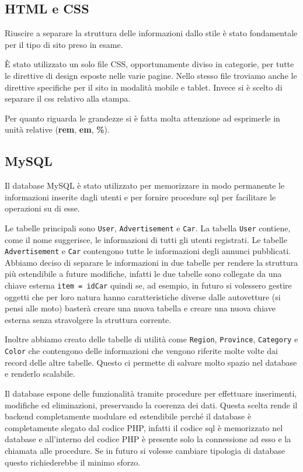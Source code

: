 	\subsection{HTML e CSS}
	\par Riuscire a separare la struttura delle informazioni dallo stile è stato fondamentale per il tipo di sito preso in esame.
	\par \`E stato utilizzato un solo file CSS, opportunamente diviso in categorie, per tutte le direttive di design esposte nelle varie pagine. Nello stesso file troviamo anche le direttive specifiche per il sito in modalità mobile e tablet. Invece si è scelto di separare il css relativo alla stampa. 
	\par Per quanto riguarda le grandezze si è fatta molta attenzione ad esprimerle in unità relative (\textbf{rem}, \textbf{em}, \textbf{\%}).
	\subsection{MySQL}
	\par Il database MySQL è stato utilizzato per memorizzare in modo permanente le informazioni inserite dagli utenti e per fornire procedure sql per facilitare le operazioni su di esse.
  \par Le tabelle principali sono \texttt{User}, \texttt{Advertisement} e \texttt{Car}. La tabella \texttt{User} contiene, come il nome suggerisce, le informazioni di tutti gli utenti registrati. Le tabelle \texttt{Advertisement} e \texttt{Car} contengono tutte le informazioni degli annunci pubblicati. Abbiamo deciso di separare le informazioni in due tabelle per rendere la struttura pi\`u estendibile a future modifiche, infatti le due tabelle sono collegate da una chiave esterna \texttt{item = idCar} quindi se, ad esempio, in futuro si volessero gestire oggetti che per loro natura hanno caratteristiche diverse dalle autovetture (si pensi alle moto) baster\`a creare una nuova tabella e creare una nuova chiave esterna senza stravolgere la struttura corrente.
  \par Inoltre abbiamo creato delle tabelle di utilit\`a come \texttt{Region}, \texttt{Province}, \texttt{Category} e \texttt{Color} che contengono delle informazioni che vengono riferite molte volte dai record delle altre tabelle. Questo ci permette di salvare molto spazio nel database e renderlo scalabile.
  \par Il database espone delle funzionalità tramite procedure per effettuare inserimenti, modifiche ed eliminazioni, preservando la coerenza dei dati. Questa scelta rende il backend completamente modulare ed estendibile perch\'e il database \`e completamente slegato dal codice PHP, infatti il codice sql \`e memorizzato nel database e all'interno del codice PHP \`e presente solo la connessione ad esso e la chiamata alle procedure. Se in futuro si volesse cambiare tipologia di database questo richiederebbe il minimo sforzo. 
